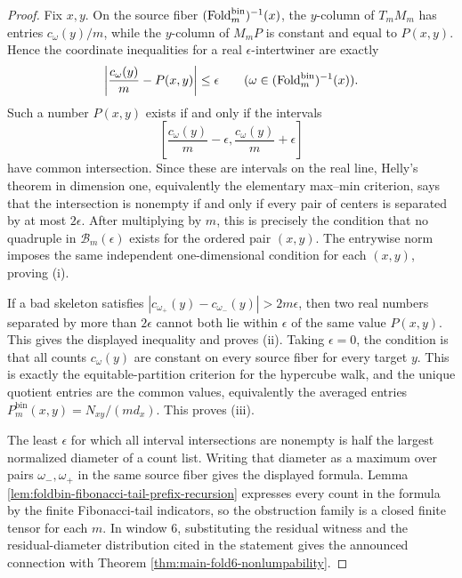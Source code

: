 \begin{proof}
Fix \(x,y\).  On the source fiber \((\operatorname{Fold}_m^{\mathrm{bin}})^{-1}(x)\), the \(y\)-column of \(T_mM_m\) has entries \(c_\omega(y)/m\), while the \(y\)-column of \(M_mP\) is constant and equal to \(P(x,y)\).  Hence the coordinate inequalities for a real \(\epsilon\)-intertwiner are exactly
\[
\left|\frac{c_\omega(y)}{m}-P(x,y)\right|\le\epsilon
\qquad
(\omega\in(\operatorname{Fold}_m^{\mathrm{bin}})^{-1}(x)).
\]
Such a number \(P(x,y)\) exists if and only if the intervals
\[
\left[\frac{c_\omega(y)}{m}-\epsilon,
\frac{c_\omega(y)}{m}+\epsilon\right]
\]
have common intersection.  Since these are intervals on the real line, Helly's theorem in dimension one, equivalently the elementary max--min criterion, says that the intersection is nonempty if and only if every pair of centers is separated by at most \(2\epsilon\).  After multiplying by \(m\), this is precisely the condition that no quadruple in \(\mathcal B_m(\epsilon)\) exists for the ordered pair \((x,y)\).  The entrywise norm imposes the same independent one-dimensional condition for each \((x,y)\), proving \textup{(i)}.

If a bad skeleton satisfies \(|c_{\omega_+}(y)-c_{\omega_-}(y)|>2m\epsilon\), then two real numbers separated by more than \(2\epsilon\) cannot both lie within \(\epsilon\) of the same value \(P(x,y)\).  This gives the displayed inequality and proves \textup{(ii)}.  Taking \(\epsilon=0\), the condition is that all counts \(c_\omega(y)\) are constant on every source fiber for every target \(y\).  This is exactly the equitable-partition criterion for the hypercube walk, and the unique quotient entries are the common values, equivalently the averaged entries \(P_m^{\mathrm{bin}}(x,y)=N_{xy}/(m d_x)\).  This proves \textup{(iii)}.

The least \(\epsilon\) for which all interval intersections are nonempty is half the largest normalized diameter of a count list.  Writing that diameter as a maximum over pairs \(\omega_-,\omega_+\) in the same source fiber gives the displayed formula.  Lemma \ref{lem:foldbin-fibonacci-tail-prefix-recursion} expresses every count in the formula by the finite Fibonacci-tail indicators, so the obstruction family is a closed finite tensor for each \(m\).  In window \(6\), substituting the residual witness and the residual-diameter distribution cited in the statement gives the announced connection with Theorem \ref{thm:main-fold6-nonlumpability}. \qedhere
\end{proof}

